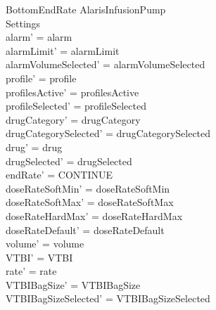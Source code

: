 \begin{schema}{BottomEndRate}
	\Delta AlarisInfusionPump\\
	 Settings\\
	\where
	alarm' = alarm\\
	alarmLimit' = alarmLimit\\
	alarmVolumeSelected' = alarmVolumeSelected\\
	profile' = profile\\
	profilesActive' = profilesActive\\
	profileSelected' = profileSelected\\
	drugCategory' = drugCategory\\ 
	drugCategorySelected' = drugCategorySelected\\
	drug' = drug\\ 
	drugSelected' = drugSelected\\
	endRate' = CONTINUE\\
	doseRateSoftMin' = doseRateSoftMin\\
	doseRateSoftMax' = doseRateSoftMax\\
	doseRateHardMax' = doseRateHardMax\\
	doseRateDefault' = doseRateDefault\\
	volume' = volume\\
	\pagebreak
	VTBI' = VTBI\\
	rate' = rate\\
	VTBIBagSize' = VTBIBagSize\\ 
	VTBIBagSizeSelected' = VTBIBagSizeSelected\\

\end{schema}
